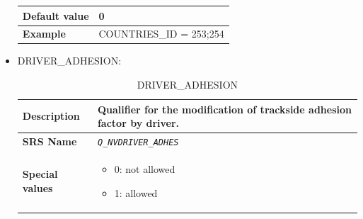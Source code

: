 \documentclass{template/openetcs}
\begin{document}
\begin{itemize}
\begin{longtable}{|l|l|}
				\hline
				
					\begin{minipage}[t]{0.22\linewidth} \textbf{Default value}	\end{minipage} 
				&	\begin{minipage}[t]{0.78\linewidth} 0 \end{minipage} \\
				
				\hline
				
					\begin{minipage}[t]{0.22\linewidth} \textbf{Example}	\end{minipage} 
				&	\begin{minipage}[t]{0.78\linewidth} COUNTRIES\_ID = 253;254 \end{minipage} \\
				
				\hline
				
			\end{longtable}			
			
		\item DRIVER\_ADHESION:
		
			\begin{longtable}{|l|l|}
				\caption{DRIVER\_ADHESION}\\ 	
				\hline
				
					\begin{minipage}[t]{0.22\linewidth} \textbf{Description}	\end{minipage} 
				&	\begin{minipage}[t]{0.78\linewidth} Qualifier for the modification of trackside adhesion factor by driver. \end{minipage} \\
				
				\hline
				
					\begin{minipage}[t]{0.22\linewidth} \textbf{SRS Name}	\end{minipage} 
				&	\begin{minipage}[t]{0.78\linewidth} \emph{\texttt{Q\_NVDRIVER\_ADHES}} \end{minipage} \\
				
				\hline
														
					\begin{minipage}[t]{0.22\linewidth} \textbf{Special values}	\end{minipage} 
				&	\begin{minipage}[t]{0.78\linewidth} \begin{itemize} \item 0: not allowed \item 1: allowed \end{itemize} \end{minipage} \\
				

\end{longtable}
\end{itemize}
\end{document}
